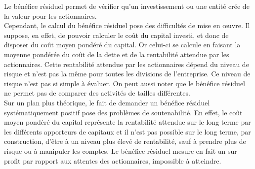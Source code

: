 \documentclass{tufte-handout}
\begin{document}
\begin{enumerate}
Le bénéfice résiduel permet de vérifier qu'un investissement ou une entité crée de la valeur pour les actionnaires.\\

Cependant, le calcul du bénéfice résiduel pose des difficultés de mise en œuvre. Il suppose, en effet, de pouvoir calculer le coût du capital investi, et donc de disposer du coût moyen pondéré du capital. Or celui-ci se calcule en faisant la moyenne pondérée du coût de la dette et de la rentabilité attendue par les actionnaires. Cette rentabilité attendue par les actionnaires dépend du niveau de risque et n'est pas la même pour toutes les divisions de l'entreprise. Ce niveau de risque n'est pas si simple à évaluer. On peut aussi noter que le bénéfice résiduel ne permet pas de comparer des activités de tailles différentes.\\

Sur un plan plus théorique, le fait de demander un bénéfice résiduel systématiquement positif pose des problèmes de soutenabilité. En effet, le coût moyen pondéré du capital représente la rentabilité attendue sur le long terme par les différents apporteurs de capitaux et il n'est pas possible sur le long terme, par construction, d'être à un niveau plus élevé de rentabilité, sauf à prendre plus de risque ou à manipuler les comptes. Le bénéfice résiduel mesure en fait un sur-profit par rapport aux attentes des actionnaires, impossible à atteindre.\\
\end{enumerate}
\end{document}

